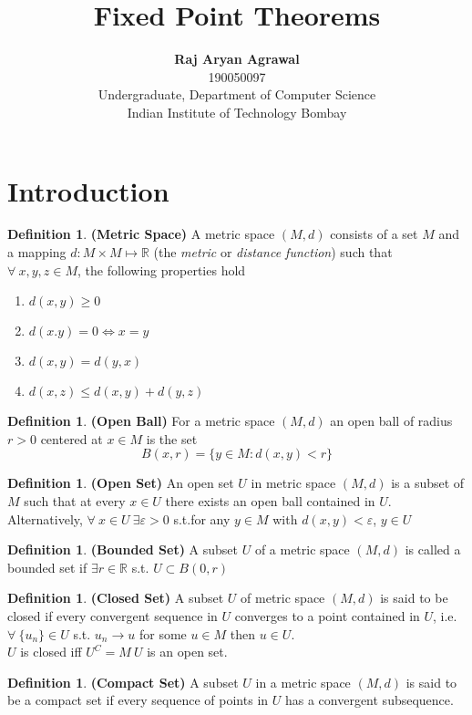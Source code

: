 \documentclass{article}
\title{Fixed Point Theorems}
\author{
	\textbf{Raj Aryan Agrawal}\\
	190050097\\
	Undergraduate, Department of Computer Science\\
	Indian Institute of Technology Bombay\\
}
\theoremstyle{definition}
\newtheorem{defn}[theorem]{Definition}
\begin{document}
\maketitle
\tableofcontents
\section{Introduction}
\begin{defn}
\textbf{(Metric Space)} A metric space $(M,d)$ consists of a set $M$ and a mapping $d: M\times M \mapsto \mathbb{R}$ (the \textit{metric} or \textit{distance function}) such that $\forall~x,y,z \in M$, the following properties hold
\begin{enumerate}
	\item $d(x,y)\geq0$
	\item $d(x.y) = 0 \iff x=y$
	\item $ d(x,y) = d(y,x)$
	\item $d(x,z) \leq d(x,y) + d(y,z)$
\end{enumerate}
\end{defn}
\begin{defn}
\textbf{(Open Ball)} For a metric space $(M,d)$ an open ball of radius $r>0$ centered at $x\in M$ is the set $$B(x,r) = \{y\in M: d(x,y)<r\}$$
\end{defn}
\begin{defn}
\textbf{(Open Set)} An open set $U$ in metric space $(M,d)$ is a subset of $M$ such that at every $x\in U$ there exists an open ball contained in $U$.\\

Alternatively, $\forall~x\in U~\exists \varepsilon >0$ s.t.for any $y\in M$ with $d(x,y)<\varepsilon$, $y\in U$
\end{defn}
\begin{defn}
\textbf{(Bounded Set)} A subset $U$ of a metric space $(M,d)$ is called a bounded set if $\exists r\in \mathbb{R}$ s.t. $U \subset B(0,r)$
\end{defn}
\begin{defn}
\textbf{(Closed Set)} A subset $U$ of metric space $(M,d)$ is said to be closed if every convergent sequence in $U$ converges to a point contained in $U$, i.e. $\forall~\{u_n\}\in U$ s.t. $u_n\rightarrow u$ for some $u\in M$ then $u\in U$.\\

$U$ is closed iff $U^C = M\ U$ is an open set.
\end{defn}
\begin{defn}
\textbf{(Compact Set)} A subset $U$ in a metric space $(M,d)$ is said to be a compact set if every sequence of points in $U$ has a convergent subsequence.
\end{defn}
\end{document}
